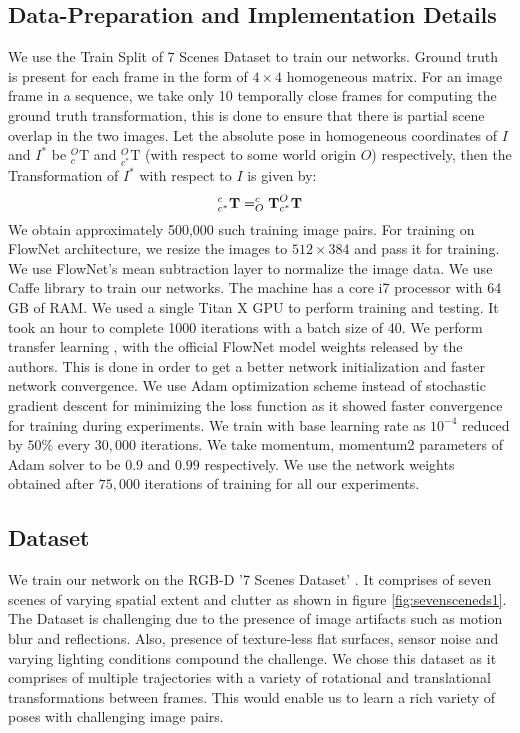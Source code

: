 \documentclass[usletter, 10 pt, conference]{ieeeconf}  %
\begin{document}
\subsection{Data-Preparation and Implementation Details}
We use the Train Split of 7 Scenes Dataset to train our networks. Ground truth is present for each frame in the form of $4\times4$ homogeneous matrix. For an image frame in a sequence, we take only 10 temporally close frames for computing the ground truth transformation, this is done to ensure that there is partial scene overlap in the two images. Let the absolute pose in homogeneous coordinates of $I$ and $I^*$ be $_{c}^{O}\textrm{T}$ and $_{c^*}^{O}\textrm{T}$ (with respect to some world origin $O$) respectively, then the Transformation of $I^*$ with respect to $I$ is given by:
\begin{equation}
_{c^*}^{c}\textrm{\textbf{T}} = _{O}^{c}\textrm{\textbf{T}} _{c^*}^{O}\textrm{\textbf{T}} 
\end{equation}
We obtain approximately 500,000 such training image pairs.
For training on FlowNet architecture, we resize the images to $512 \times 384$ and pass it for training. We use FlowNet's mean subtraction layer to normalize the image data.
We use Caffe library \cite{jia2014caffe} to train our networks. The machine has a core i7 processor with 64 GB of RAM. We used a single Titan X GPU to perform training and testing. It took an hour to complete 1000 iterations with a batch size of 40. 
We perform transfer learning \cite{yosinski2014transferable}, \cite{larochelle2009exploring} with the official FlowNet model weights released by the authors. This is done in order to get a better network initialization and faster network convergence. 
We use Adam optimization scheme instead of stochastic gradient descent for minimizing the loss function as it showed faster convergence for training during experiments. We train with base learning rate as $10^{-4}$ reduced by $50\%$ every $30,000$ iterations. We take momentum, momentum2 parameters of Adam solver to be $0.9$ and $0.99$ respectively. We use the network weights obtained after $75,000$ iterations of training for all our experiments.

\subsection{Dataset}
We train our network on the RGB-D '7 Scenes Dataset' \cite{glocker2013real}. It comprises of seven scenes of varying spatial extent and clutter as shown in figure \ref{fig:sevensceneds1}. The Dataset is challenging due to the presence of image artifacts such as motion blur and reflections. Also, presence of texture-less flat surfaces, sensor noise and varying lighting conditions compound the challenge. We chose this dataset as it comprises of multiple trajectories with a variety of rotational and translational transformations between frames. This would enable us to learn a rich variety of poses with challenging image pairs.  
\end{document}
